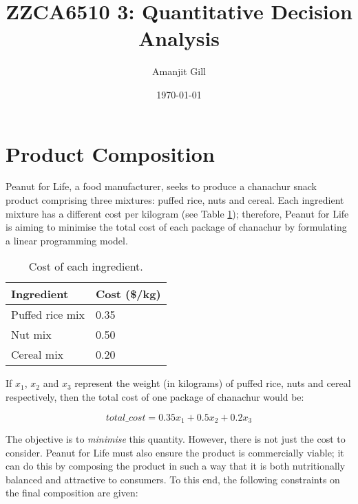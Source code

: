 \documentclass[11pt, a4paper]{article}
\title{\LARGE\bfseries ZZCA6510 3: Quantitative Decision Analysis}
\author{\Large Amanjit Gill}
\date{\normalsize \today}
\begin{document}
    
    \maketitle

    \thispagestyle{empty}

    \newpage

    \addtocounter{page}{-1}

    \section{Product Composition}

    Peanut for Life, a food manufacturer, seeks to produce a chanachur snack product comprising three mixtures: puffed rice, nuts and cereal. Each ingredient mixture has a different cost per kilogram (see Table \ref{costs}); therefore, Peanut for Life is aiming to minimise the total cost of each package of chanachur by formulating a linear programming model. 
    
    \begin{table}[!ht]
        \centering
        \caption{Cost of each ingredient.}
        \begin{tabular}{|l|l|}
            \hline
            Ingredient & Cost (\$/kg) \\ \hline
            Puffed rice mix & 0.35 \\ \hline
            Nut mix & 0.50 \\ \hline
            Cereal mix & 0.20 \\ \hline          
        \end{tabular}
        \label{costs}
    \end{table}
    
    
    If $x_{1}$, $x_{2}$ and $x_{3}$ represent the weight (in kilograms) of puffed rice, nuts and cereal respectively, then the total cost of one package of chanachur would be:

    \begin{equation}
        total\_cost = 0.35x_1 + 0.5x_2 + 0.2x_3
        \label{obj_func1}
    \end{equation}
    
    The objective is to \textit{minimise} this quantity. However, there is not just the cost to consider. Peanut for Life must also ensure the product is commercially viable; it can do this by composing the product in such a way that it is both nutritionally balanced and attractive to consumers. To this end, the following constraints on the final composition are given:
\end{document}
